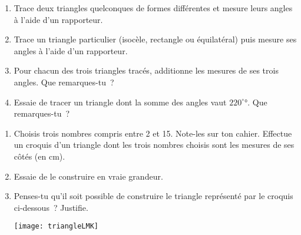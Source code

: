 
\begin{activite}

\begin{enumerate}
\item Trace deux triangles quelconques de formes différentes et mesure leurs angles à l'aide d'un rapporteur.

\item Trace un triangle particulier (isocèle, rectangle ou équilatéral) puis mesure ses angles à l'aide d'un rapporteur.

\item Pour chacun des trois triangles tracés, additionne les mesures de ses trois angles. Que remarques-tu ?

\item Essaie de tracer un triangle dont la somme des angles vaut $220^\circ°$. Que remarques-tu ?
\end{enumerate}

\end{activite}


\begin{activite}

\begin{enumerate}
\item Choisis trois nombres compris entre 2 et 15. Note-les sur ton cahier. Effectue un croquis d'un triangle dont les trois nombres choisis sont les mesures de ses côtés (en cm).

\item Essaie de le construire en vraie grandeur.

\item Penses-tu qu'il soit possible de construire le triangle représenté par le croquis ci-dessous ? Justifie.

\begin{center} \texttt{[image: triangleLMK]} \end{center}
\end{enumerate}

\end{activite}


